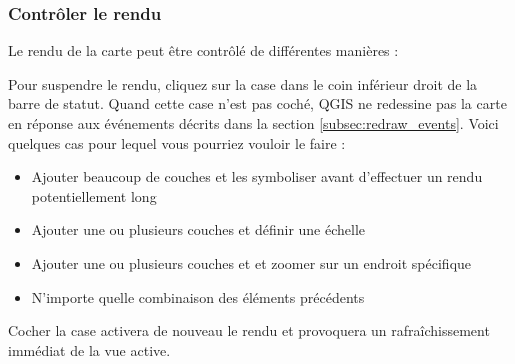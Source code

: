 \subsubsection{Contrôler le rendu}\label{label_controlmap}

Le rendu de la carte peut être contrôlé de différentes manières :

%
%
%

\label{label_suspendrender}

Pour suspendre le rendu, cliquez sur la case dans le coin inférieur droit de la barre de statut. Quand cette case n'est pas coché, QGIS ne redessine pas la carte en réponse aux événements décrits dans la section \ref{subsec:redraw_events}. Voici quelques cas pour lequel vous pourriez vouloir le faire :

\begin{itemize}
\item Ajouter beaucoup de couches et les symboliser avant d'effectuer un rendu potentiellement long
\item Ajouter une ou plusieurs couches et définir une échelle
\item Ajouter une ou plusieurs couches et et zoomer sur un endroit spécifique
\item N'importe quelle combinaison des éléments précédents
\end{itemize}

Cocher la case  activera de nouveau le rendu et provoquera un rafraîchissement immédiat de la vue active.

